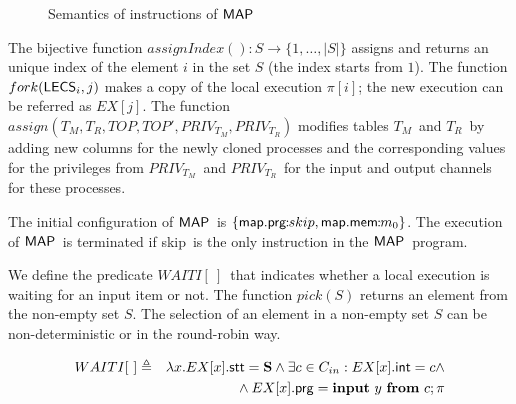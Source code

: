 \documentclass[10pt,a4paper,oneside]{article}
\def\select#1{\ensuremath{pick(#1)}}
\def\fork#1#2{\ensuremath{fork(#1,#2)}}
\def\fassign#1#2#3#4#5#6{\ensuremath{assign(#1,#2,#3,#4,#5,#6)}}
\def\intsig#1{\ensuremath{#1}}
\def\ProgM{\ensuremath{\Prog_{M}}}
\def\sS{\textbf{S}}
\def\TAV{\ensuremath{T_{M}}}
\def\TPV{\ensuremath{T_{R}}}
\def\ST{{\ensuremath{EX}}}
\def\TOP{\ensuremath{TOP}}
\def\chnl{\ensuremath{c}}
\def\NIL{\ensuremath{\bot}}
\def\Cin{\ensuremath{C_{in}}}
\def\ACCORCIA{\vspace*{-\baselineskip}}
\def\lcomma{\ensuremath{\!\!:\!\!}}
\def\sanserif#1{\ensuremath{\sf #1}}
\def\MAP{\ensuremath{\sanserif{MAP}}}
\def\Prog{\ensuremath{\pi}}
\def\Progl#1{\ensuremath{\Prog[#1]}}
\def\comm{\ensuremath{\pi}}
\def\commM{\ensuremath{\comm_M}}
\def\LabelRule#1#2#3{\ensuremath{{\inferrule*[Left={#1}]{#2}{#3}}}}
\def\RMAPINIT{MACT}
\def\NSKIP{skip}
\def\iinput#1#2{\textbf{input}~\ensuremath{#1}~\textbf{from}~\ensuremath{#2}}
\def\iskip{\ensuremath{\textbf{\NSKIP}}}
\def\NINIMAP{\ensuremath{WAITI}}
\def\emptyPlace{\ensuremath{[\ ]}}
\def\INIMAPD{\ensuremath{\NINIMAP\emptyPlace}}
\def\INIMAPE#1{\ensuremath{\NINIMAP[#1]}}
\def\indexOf#1{\ensuremath{assignIndex(#1)}}
\def\lprog{{\sf prg}}
\def\lprogm{{\sf prg}}
\def\lmem{{\sf mem}}
\def\lmemm{{\sf \ensuremath{mem}}}
\def\ltav{\ensuremath{{\sf t_{m}}}}
\def\ltpv{\ensuremath{{\sf t_{r}}}}
\def\ltop{{\sf top}}
\def\LECS{{\sf \ensuremath{LECS}}}
\def\LECSI{\ensuremath{\LECS_{i}}}
\def\litr{{\sf int}}
\def\lmap{{\sf map}}
\def\lstate{{\sf stt}}
\def\tcolm{\ensuremath{PRIV_{T_M}}}
\def\tcolr{\ensuremath{PRIV_{T_R}}}
\begin{document}
\begin{figure}[!t]
\begin{center}
\ACCORCIA
\caption{Semantics of instructions of \MAP}
	\label{fig:sem:MAP}
\end{center}
\end{figure}

The bijective function $\indexOf{}:S \rightarrow \{1, \dots, |S|\}$ assigns and returns an unique index of the element $i$ in the set $S$ (the index starts from $1$). The function $\fork{\LECSI}{j}$ makes a copy of the local execution \Progl{i}; the new execution can be referred as $\ST[j]$. The function \fassign{\TAV}{\TPV}{\TOP}{\TOP'}{\tcolm}{\tcolr} modifies tables \TAV\ and \TPV\ by adding new columns for the newly cloned processes and the corresponding values for the privileges from \tcolm\ and \tcolr\ for the input and output channels for these processes.

The initial configuration of \MAP\ is $\{\lmap.\lprogm\lcomma\NSKIP, \lmap.\lmem\lcomma m_0 \}$. The execution of \MAP\ is terminated if \NSKIP\ is the only instruction in the \MAP\ program.

We define the predicate  \INIMAPD\ that indicates whether a local execution is waiting for an input  item or not. The function $\select{S}$ returns an element from the non-empty set $S$. The selection of an element in a non-empty set $S$ can be non-deterministic or in the round-robin way.

\begin{eqnarray*}
\INIMAPD &\triangleq & \lambda x. \ST[x].\lstate = \sS \wedge \exists \chnl \in \Cin: \ST[x].\litr = \intsig{\chnl} \wedge \nonumber \\
		& & {}\wedge \ST[x].\lprog = \iinput{y}{\chnl};\comm
\end{eqnarray*}
\end{document}

